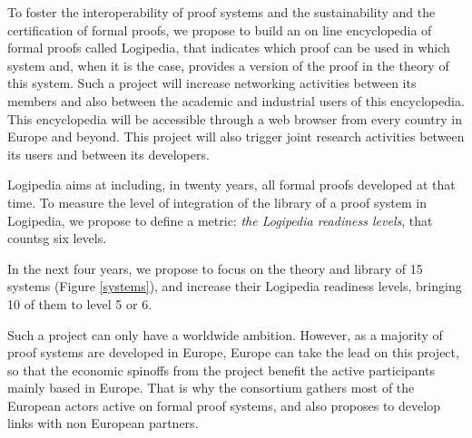 To foster the interoperability of proof systems and the sustainability
and the certification of formal proofs, we propose to build an on line
encyclopedia of formal proofs called {\sc Logipedia}, that indicates
which proof can be used in which system and, when it is the case,
provides a version of the proof in the theory of this system.  Such a
project will increase networking activities between its members and
also between the academic and industrial users of this encyclopedia.
This encyclopedia will be accessible through a web browser from every
country in Europe and beyond. This project will also trigger joint
research activities between its users and between its developers.

{\sc Logipedia} aims at including, in twenty years, all formal proofs
developed at that time. To measure the level of integration of the
library of a proof system in {\sc Logipedia}, we propose to define a
metric: {\em the {\sc Logipedia} readiness levels}, that countsg six
levels.

In the next four years, we propose to focus on the theory and library
of 15 systems (Figure \ref{systems}), and increase their {\sc
  Logipedia} readiness levels, bringing 10 of them to level 5 or 6.

Such a project can only have a worldwide ambition. However, as a
majority of proof systems are developed in Europe, Europe can take the
lead on this project, so that the economic spinoffs from the project
benefit the active participants mainly based in Europe.  That is why
the consortium gathers most of the European actors active on formal
proof systems, and also proposes to develop links with non European
partners.


